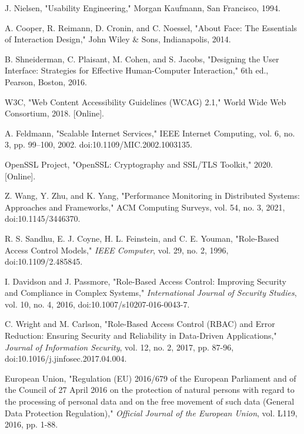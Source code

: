 \begin{thebibliography}{99}
J. Nielsen, "Usability Engineering," Morgan Kaufmann, San Francisco, 1994.

A. Cooper, R. Reimann, D. Cronin, and C. Noessel, "About Face: The Essentials of Interaction Design," John Wiley \& Sons, Indianapolis, 2014.

B. Shneiderman, C. Plaisant, M. Cohen, and S. Jacobs, "Designing the User Interface: Strategies for Effective Human-Computer Interaction," 6th ed., Pearson, Boston, 2016.

W3C, "Web Content Accessibility Guidelines (WCAG) 2.1," World Wide Web Consortium, 2018. [Online].

A. Feldmann, "Scalable Internet Services," IEEE Internet Computing, vol. 6, no. 3, pp. 99–100, 2002. doi:10.1109/MIC.2002.1003135.

OpenSSL Project, "OpenSSL: Cryptography and SSL/TLS Toolkit," 2020. [Online].

Z. Wang, Y. Zhu, and K. Yang, "Performance Monitoring in Distributed Systems: Approaches and Frameworks," ACM Computing Surveys, vol. 54, no. 3, 2021, doi:10.1145/3446370.

R. S. Sandhu, E. J. Coyne, H. L. Feinstein, and C. E. Youman, "Role-Based Access Control Models," \textit{IEEE Computer}, vol. 29, no. 2, 1996, doi:10.1109/2.485845.

I. Davidson and J. Passmore, "Role-Based Access Control: Improving Security and Compliance in Complex Systems," \textit{International Journal of Security Studies}, vol. 10, no. 4, 2016, doi:10.1007/s10207-016-0043-7.

C. Wright and M. Carlson, "Role-Based Access Control (RBAC) and Error Reduction: Ensuring Security and Reliability in Data-Driven Applications," \textit{Journal of Information Security}, vol. 12, no. 2, 2017, pp. 87-96, doi:10.1016/j.jinfosec.2017.04.004.

European Union, "Regulation (EU) 2016/679 of the European Parliament and of the Council of 27 April 2016 on the protection of natural persons with regard to the processing of personal data and on the free movement of such data (General Data Protection Regulation)," \textit{Official Journal of the European Union}, vol. L119, 2016, pp. 1-88.
\end{thebibliography}


